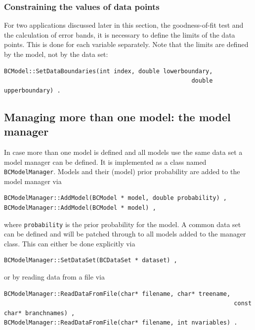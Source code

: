 \documentclass[11pt, a4paper]{article}
\begin{document}

\subsubsection{Constraining the values of data points}

For two applications discussed later in this section, the
goodness-of-fit test and the calculation of error bands, it is
necessary to define the limits of the data points. This is done for
each variable separately. Note that the limits are defined by the
model, not by the data set:
%
\begin{verbatim}
BCModel::SetDataBoundaries(int index, double lowerboundary, 
													 double upperboundary) . 
\end{verbatim}


\subsection{Managing more than one model: the model manager} 
\label{subsection:modelmanager}

In case more than one model is defined and all models use the same
data set a model manager can be defined. It is implemented as a class
named \verb|BCModelManager|. Models and their (model) prior
probability are added to the model manager via
% 
\begin{verbatim}
BCModelManager::AddModel(BCModel * model, double probability) , 
BCModelManager::AddModel(BCModel * model) , 
\end{verbatim} 

\noindent 
where \verb|probability| is the prior probability for the model. A
common data set can be defined and will be patched through to all
models added to the manager class. This can either be done explicitly
via
%
\begin{verbatim}
BCModelManager::SetDataSet(BCDataSet * dataset) , 
\end{verbatim} 

\noindent 
or by reading data from a file via 
%
\begin{verbatim}
BCModelManager::ReadDataFromFile(char* filename, char* treename, 
																 const char* branchnames) , 
BCModelManager::ReadDataFromFile(char* filename, int nvariables) . 
\end{verbatim} 
\end{document}
